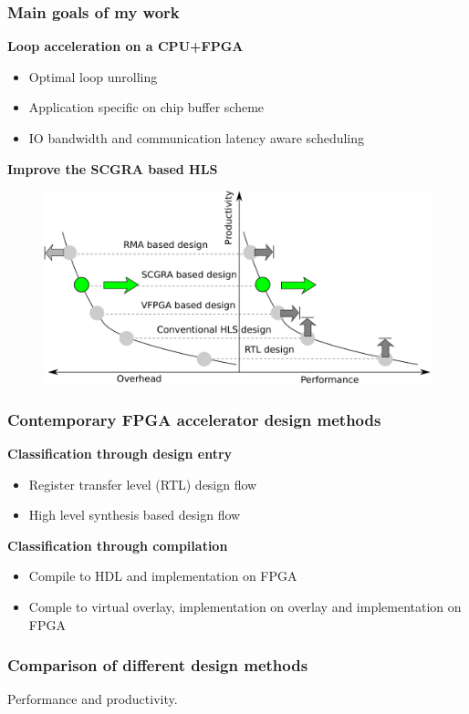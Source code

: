 \documentclass{beamer}
\begin{document}
\begin{frame}[t]
\frametitle{Main goals of my work}
\textbf{Loop acceleration on a CPU+FPGA}
\begin{itemize}
\item Optimal loop unrolling
\item Application specific on chip buffer scheme 
\item IO bandwidth and communication latency aware scheduling
\end{itemize}

\textbf{Improve the SCGRA based HLS}
\begin{figure}
\vspace{-1em}
\includegraphics[width=0.7\linewidth]{design-goal}
\end{figure}

\end{frame}

\begin{frame}[t]
\frametitle{Contemporary FPGA accelerator design methods}
\textbf{Classification through design entry}
\begin{itemize}
\item Register transfer level (RTL) design flow
\item High level synthesis based design flow
\end{itemize}

\textbf{Classification through compilation}
\begin{itemize}
\item Compile to HDL and implementation on FPGA
\item Comple to virtual overlay, implementation on overlay and implementation on FPGA
\end{itemize}

\end{frame}

\begin{frame}

\frametitle{Comparison of different design methods}
Performance and productivity.

\end{frame}
\end{document}
